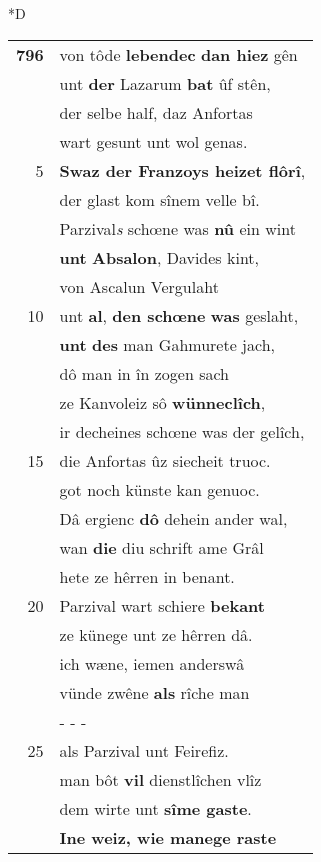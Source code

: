 \documentclass[8pt,a4paper,notitlepage]{article}
\begin{document}
\begin{table}[ht]
\begin{minipage}[t]{0.5\linewidth}
\small
\begin{center}*D
\end{center}
\begin{tabular}{rl}
\textbf{796} & von tôde \textbf{lebendec} \textbf{dan hiez} gên\\ 
 & unt \textbf{der} Lazarum \textbf{bat} ûf stên,\\ 
 & der selbe half, daz Anfortas\\ 
 & wart gesunt unt wol genas.\\ 
5 & \textbf{Swaz der Franzoys heizet flôrî},\\ 
 & der glast kom sînem velle bî.\\ 
 & Parzival\textit{s} schœne was \textbf{nû} ein wint\\ 
 & \textbf{unt} \textbf{Absalon}, Davides kint,\\ 
 & von Ascalun Vergulaht\\ 
10 & unt \textbf{al}, \textbf{den schœne} \textbf{was} geslaht,\\ 
 & \textbf{unt} \textbf{des} man Gahmurete jach,\\ 
 & dô man in în zogen sach\\ 
 & ze Kanvoleiz sô \textbf{wünneclîch},\\ 
 & ir decheines schœne was der gelîch,\\ 
15 & die Anfortas ûz siecheit truoc.\\ 
 & got noch künste kan genuoc.\\ 
 & Dâ ergienc \textbf{dô} dehein ander wal,\\ 
 & wan \textbf{die} diu schrift ame Grâl\\ 
 & hete ze hêrren in benant.\\ 
20 & Parzival wart schiere \textbf{bekant}\\ 
 & ze künege unt ze hêrren dâ.\\ 
 & ich wæne, iemen anderswâ\\ 
 & vünde zwêne \textbf{als} rîche man\\ 
 & \multicolumn{1}{l}{ - - - }\\ 
25 & als Parzival unt Feirefiz.\\ 
 & man bôt \textbf{vil} dienstlîchen vlîz\\ 
 & dem wirte unt \textbf{sîme gaste}.\\ 
 & \textbf{Ine weiz, wie manege raste}\\ 

\end{tabular}
\end{minipage}
\end{table}
\end{document}
